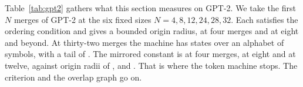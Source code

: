 \documentclass[11pt,a4paper]{article}
\theoremstyle{definition}
\theoremstyle{plain}
\begin{document}
Table~\ref{tab:gpt2} gathers what this section measures on GPT-2. We take the first \(N\) merges of GPT-2 at the six
fixed sizes \(N = 4, 8, 12, 24, 28, 32\). Each satisfies the ordering condition and gives a bounded origin radius,
\RealRadiusFour{} at four merges and \RealRadiusThirtyTwo{} at eight and beyond. At thirty-two merges the machine has
\RealStates{} states over an alphabet of \RealAlphabet{} symbols, with a tail of \RealTail{}. The mirrored constant is
\RealMirroredFour{} at four merges, \RealMirroredEight{} at eight and \RealMirroredTwelve{} at twelve, against origin
radii of \RealRadiusFour{}, \RealRadiusEight{} and \RealRadiusTwelve{}. That is where the token machine stops. The
criterion and the overlap graph go on.

\end{document}
